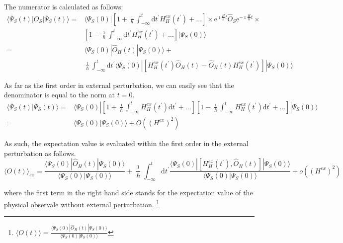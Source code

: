 The numerator is calculated as follows:
\begin{equation} \label{Eqs3.1.7}\begin{split}
\langle \overline{\Psi}_S(t)|O_S|\overline{\Psi}_S(t)\rangle = & \langle \Psi_S(0) | \left[ 1 + \frac{\imath}{\hbar}\int_{-\infty}^{t} \mathrm{d} t^{'} H_H^{ex}(t^{'}) + \ldots \right] \times \mathrm{e}^{\imath \frac{H}{\hbar} t} \hat{O}_S \mathrm{e}^{-\imath \frac{H}{\hbar} t} \times \\
&\left[ 1 - \frac{\imath}{\hbar}\int_{-\infty}^{t} \mathrm{d} t^{'} H_H^{ex}(t^{'}) + \ldots \right] | \Psi_S(0) \rangle\\
=&\langle \Psi_S(0)|\hat{O}_H(t)|\Psi_S(0)\rangle +\\
& \frac{\imath}{\hbar} \int_{-\infty}^{t} \mathrm{d} t^{'} \langle \Psi_S(0) | \left[ H_H^{ex}(t^{'})\hat{O}_H(t) - \hat{O}_H(t)H_H^{ex}(t^{'}) \right] | \Psi_S(0) \rangle
\end{split}\end{equation}

As far as the first order in external perturbation, we can easily see that the denominator is equal to the norm at $t=0$.
\[\begin{split} \langle \overline{\Psi}_S(t) | \overline{\Psi}_S(t) \rangle =& \langle \Psi_S(0) | \left[ 1 + \frac{\imath}{\hbar} \int_{-\infty}^{t} H_H^{ex} (t^{'}) \mathrm{d} t^{'} + \ldots \right]
\left[ 1 - \frac{\imath}{\hbar} \int_{-\infty}^{t} H_H^{ex} (t^{'}) \mathrm{d} t^{'} + \ldots \right] | \Psi_S(0) \rangle\\
=& \langle \Psi_S(0) | \Psi_S(0) \rangle + O((H^{ex})^2)
\end{split}\]

As such, the expectation value is evaluated within the first order in the external perturbation as follows.
\begin{equation} \label{Eqs3.1.8}
\langle O(t) \rangle_{ex} = \frac{\langle \Psi_S(0)|\hat{O}_H(t)|\Psi_S(0)\rangle}{\langle \Psi_S(0)|\Psi_S(0)\rangle} + \frac{\imath}{\hbar} \int_{-\infty}^{t} \mathrm{d}t^{'} \frac{\langle \Psi_S(0)|\left[ H_H^{ex}(t^{'}), \hat{O}_H(t) \right]|\Psi_S(0)\rangle}{\langle \Psi_S(0)|\Psi_S(0)\rangle} + o((H^{ex})^2)
\end{equation}

where the first term in the right hand side stands for the expectation value of the physical observale without external perturbation.
\footnote{$\langle O(t) \rangle = \frac{\langle \Psi_S(0)|\hat{O}_H(t)|\Psi_S(0)\rangle}{\langle \Psi_S(0)|\Psi_S(0)\rangle}$}

